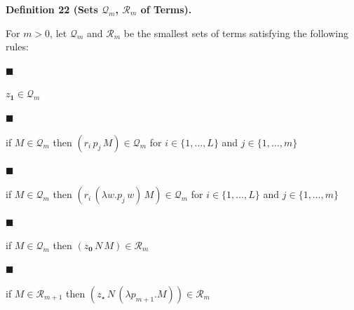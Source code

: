 \documentclass[10pt,a4paper]{amsart}
\begin{document}
 
 
\par\medskip\noindent\textbf{Definition 22 (Sets $\mathcal{Q}_{m}$, $\mathcal{R}_{m}$ of Terms).}\par
 
 
For $m>0$, let $\mathcal{Q}_{m}$ and $\mathcal{R}_{m}$ be the smallest sets of terms satisfying the following rules:\par
  
\par\noindent  $\blacksquare$ 
 
$z_{\mathbf{1}}\in\mathcal{Q}_{m}$\par
 
 
 
\par\noindent  $\blacksquare$ 
 
if $M\in\mathcal{Q}_{m}$ then $(r_{i}\,p_{j}\,M)\in\mathcal{Q}_{m}$ for $i\in\{1,\ldots,L\}$ and $j\in\{1,\ldots,m\}$\par
 
 
 
\par\noindent  $\blacksquare$ 
 
if $M\in\mathcal{Q}_{m}$ then $(r_{i}\,(\lambda w.p_{j}\,w)\,M)\in\mathcal{Q}_{m}$ for $i\in\{1,\ldots,L\}$ and $j\in\{1,\ldots,m\}$\par
 
 
 
\par\noindent  $\blacksquare$ 
 
if $M\in\mathcal{Q}_{m}$ then $(z_{\mathbf{0}}\,N\,M)\in\mathcal{R}_{m}$\par
 
 
 
\par\noindent  $\blacksquare$ 
 
if $M\in\mathcal{R}_{m+1}$ then $(z_{\star}\,N\,(\lambda p_{m+1}.M))\in\mathcal{R}_{m}$\par
 
 
  
 
 
 
\end{document}
